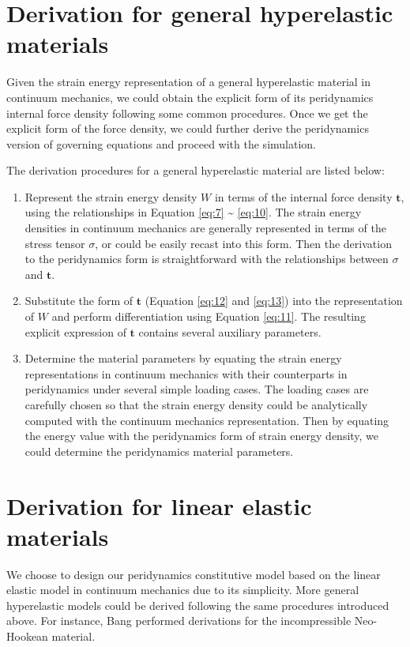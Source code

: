 \documentclass[11pt,fullpage]{article}
\newcommand{\mb}[1]{\mathbf{#1}}
\newcommand{\blue}[1]{#1}
\begin{document}
\section{Derivation for general hyperelastic materials}\label{section:3}

Given the strain energy representation of a general hyperelastic material in continuum mechanics, we could obtain the explicit form of its peridynamics internal force density following some common procedures. Once we get the explicit form of the force density, we could further derive the peridynamics version of governing equations and proceed with the simulation.

The derivation procedures for a general hyperelastic material are listed below:
\begin{enumerate}
\item{Represent the strain energy density $W$ in terms of the internal force density $\mb{t}$, using the relationships in Equation \blue{\ref{eq:7}} \~{} \blue{\ref{eq:10}}. The strain energy densities in continuum mechanics are generally represented in terms of the stress tensor $\sigma$, or could be easily recast into this form. Then the derivation to the peridynamics form is straightforward with the relationships between $\sigma$ and $\mb{t}$.}
\item{Substitute the form of $\mb{t}$ (Equation \blue{\ref{eq:12}} and \blue{\ref{eq:13}}) into the representation of $W$ and perform differentiation using Equation \blue{\ref{eq:11}}. The resulting explicit expression of $\mb{t}$ contains several auxiliary parameters.}
\item{Determine the material parameters by equating the strain energy representations in continuum mechanics with their counterparts in peridynamics under several simple loading cases. The loading cases are carefully chosen so that the strain energy density could be analytically computed with the continuum mechanics representation. Then by equating the energy value with the peridynamics form of strain energy density, we could determine the peridynamics material parameters.}
\end{enumerate}

\section{Derivation for linear elastic materials}\label{section:4}

We choose to design our peridynamics constitutive model based on the linear elastic model in continuum mechanics due to its simplicity. More general hyperelastic models could be derived following the same procedures introduced above. For instance, Bang\blue{\cite{bang2016peridynamic}} performed derivations for the incompressible Neo-Hookean material.
\end{document}
